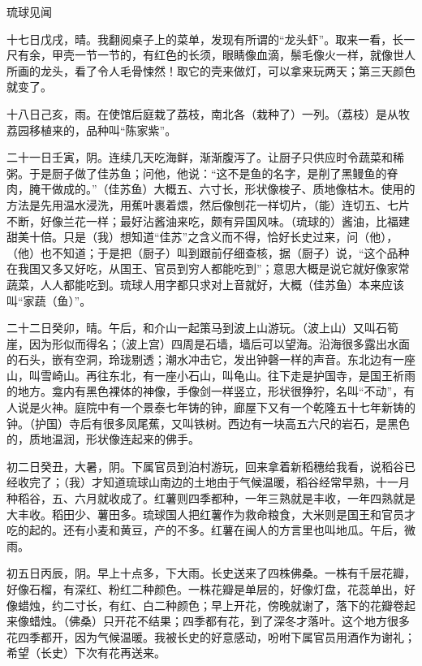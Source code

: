 \documentclass[12pt,UTF-8,openany]{ctexbook}
\begin{document}
\begin{normalsize}
    琉球见闻
    
    十七日戊戌，晴。我翻阅桌子上的菜单，发现有所谓的“龙头虾”。取来一看，长一尺有余，甲壳一节一节的，有红色的长须，眼睛像血滴，鬃毛像火一样，就像世人所画的龙头，看了令人毛骨悚然！取它的壳来做灯，可以拿来玩两天；第三天颜色就变了。
    
    十八日己亥，雨。在使馆后庭栽了荔枝，南北各（栽种了）一列。（荔枝）是从牧荔园移植来的，品种叫“陈家紫”。
    
    二十一日壬寅，阴。连续几天吃海鲜，渐渐腹泻了。让厨子只供应时令蔬菜和稀粥。于是厨子做了佳苏鱼；问他，他说：“这不是鱼的名字，是削了黑鳗鱼的脊肉，腌干做成的。”（佳苏鱼）大概五、六寸长，形状像梭子、质地像枯木。使用的方法是先用温水浸洗，用蕉叶裹着煨，然后像刨花一样切片，（能）连切五、七片不断，好像兰花一样；最好沾酱油来吃，颇有异国风味。（琉球的）酱油，比福建甜美十倍。只是（我）想知道“佳苏”之含义而不得，恰好长史过来，问（他），（他）也不知道；于是把（厨子）叫到跟前仔细查核，据（厨子）说，“这个品种在我国又多又好吃，从国王、官员到穷人都能吃到”；意思大概是说它就好像家常蔬菜，人人都能吃到。琉球人用字都只求对上音就好，大概（佳苏鱼）本来应该叫“家蔬（鱼）”。
    
    二十二日癸卯，晴。午后，和介山一起策马到波上山游玩。（波上山）又叫石筍崖，因为形似而得名；（波上宫）四周是石墙，墙后可以望海。沿海很多露出水面的石头，嵌有空洞，玲珑剔透；潮水冲击它，发出钟磬一样的声音。东北边有一座山，叫雪崎山。再往东北，有一座小石山，叫龟山。往下走是护国寺，是国王祈雨的地方。龛内有黑色裸体的神像，手像剑一样竖立，形状很狰狞，名叫“不动”，有人说是火神。庭院中有一个景泰七年铸的钟，廊屋下又有一个乾隆五十七年新铸的钟。（护国）寺后有很多凤尾蕉，又叫铁树。西边有一块高五六尺的岩石，是黑色的，质地温润，形状像连起来的佛手。
    
    初二日癸丑，大暑，阴。下属官员到泊村游玩，回来拿着新稻穗给我看，说稻谷已经收完了；（我）才知道琉球山南边的土地由于气候温暖，稻谷经常早熟，十一月种稻谷，五、六月就收成了。红薯则四季都种，一年三熟就是丰收，一年四熟就是大丰收。稻田少、薯田多。琉球国人把红薯作为救命粮食，大米则是国王和官员才吃的起的。还有小麦和黄豆，产的不多。红薯在闽人的方言里也叫地瓜。午后，微雨。
    
    初五日丙辰，阴。早上十点多，下大雨。长史送来了四株佛桑。一株有千层花瓣，好像石榴，有深红、粉红二种颜色。一株花瓣是单层的，好像灯盘，花蕊单出，好像蜡烛，约二寸长，有红、白二种颜色；早上开花，傍晚就谢了，落下的花瓣卷起来像蜡烛。（佛桑）只开花不结果；四季都有花，到了深冬才落叶。这个地方很多花四季都开，因为气候温暖。我被长史的好意感动，吩咐下属官员用酒作为谢礼；希望（长史）下次有花再送来。
    

\end{normalsize}
\end{document}

